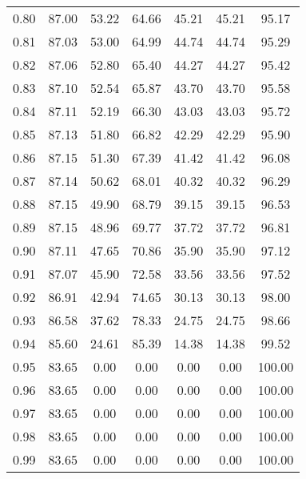 \begin{tabular}{|c|c|c|c|c|c|c|}
      0.80 &     87.00 &     53.22 &      64.66 &   45.21 &      45.21 &         95.17 \\
      0.81 &     87.03 &     53.00 &      64.99 &   44.74 &      44.74 &         95.29 \\
      0.82 &     87.06 &     52.80 &      65.40 &   44.27 &      44.27 &         95.42 \\
      0.83 &     87.10 &     52.54 &      65.87 &   43.70 &      43.70 &         95.58 \\
      0.84 &     87.11 &     52.19 &      66.30 &   43.03 &      43.03 &         95.72 \\
      0.85 &     87.13 &     51.80 &      66.82 &   42.29 &      42.29 &         95.90 \\
      0.86 &     87.15 &     51.30 &      67.39 &   41.42 &      41.42 &         96.08 \\
      0.87 &     87.14 &     50.62 &      68.01 &   40.32 &      40.32 &         96.29 \\
      0.88 &     87.15 &     49.90 &      68.79 &   39.15 &      39.15 &         96.53 \\
      0.89 &     87.15 &     48.96 &      69.77 &   37.72 &      37.72 &         96.81 \\
      0.90 &     87.11 &     47.65 &      70.86 &   35.90 &      35.90 &         97.12 \\
      0.91 &     87.07 &     45.90 &      72.58 &   33.56 &      33.56 &         97.52 \\
      0.92 &     86.91 &     42.94 &      74.65 &   30.13 &      30.13 &         98.00 \\
      0.93 &     86.58 &     37.62 &      78.33 &   24.75 &      24.75 &         98.66 \\
      0.94 &     85.60 &     24.61 &      85.39 &   14.38 &      14.38 &         99.52 \\
      0.95 &     83.65 &      0.00 &       0.00 &    0.00 &       0.00 &        100.00 \\
      0.96 &     83.65 &      0.00 &       0.00 &    0.00 &       0.00 &        100.00 \\
      0.97 &     83.65 &      0.00 &       0.00 &    0.00 &       0.00 &        100.00 \\
      0.98 &     83.65 &      0.00 &       0.00 &    0.00 &       0.00 &        100.00 \\
      0.99 &     83.65 &      0.00 &       0.00 &    0.00 &       0.00 &        100.00 \\
\bottomrule
\end{tabular}

